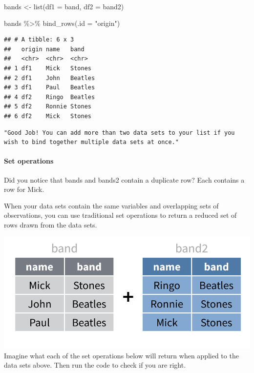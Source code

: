 \documentclass[
]{article}
\newenvironment{Shaded}{\begin{snugshade}}{\end{snugshade}}
\newcommand{\AttributeTok}[1]{\textcolor[rgb]{0.77,0.63,0.00}{#1}}
\newcommand{\FunctionTok}[1]{\textcolor[rgb]{0.00,0.00,0.00}{#1}}
\newcommand{\NormalTok}[1]{#1}
\newcommand{\OtherTok}[1]{\textcolor[rgb]{0.56,0.35,0.01}{#1}}
\newcommand{\SpecialCharTok}[1]{\textcolor[rgb]{0.00,0.00,0.00}{#1}}
\newcommand{\StringTok}[1]{\textcolor[rgb]{0.31,0.60,0.02}{#1}}
\begin{document}
\begin{Shaded}
\begin{Highlighting}[]
\NormalTok{bands }\OtherTok{\textless{}{-}} \FunctionTok{list}\NormalTok{(}\AttributeTok{df1 =}\NormalTok{ band, }
              \AttributeTok{df2 =}\NormalTok{ band2)}

\NormalTok{bands }\SpecialCharTok{\%\textgreater{}\%} \FunctionTok{bind\_rows}\NormalTok{(}\AttributeTok{.id =} \StringTok{"origin"}\NormalTok{)}
\end{Highlighting}
\end{Shaded}

\begin{verbatim}
## # A tibble: 6 x 3
##   origin name   band   
##   <chr>  <chr>  <chr>  
## 1 df1    Mick   Stones 
## 2 df1    John   Beatles
## 3 df1    Paul   Beatles
## 4 df2    Ringo  Beatles
## 5 df2    Ronnie Stones 
## 6 df2    Mick   Stones
\end{verbatim}

\begin{verbatim}
"Good Job! You can add more than two data sets to your list if you wish to bind together multiple data sets at once."
\end{verbatim}

\hypertarget{set-operations}{%
\paragraph{Set operations}\label{set-operations}}

Did you notice that bands and bands2 contain a duplicate row? Each
contains a row for Mick.

When your data sets contain the same variables and overlapping sets of
observations, you can use traditional set operations to return a reduced
set of rows drawn from the data sets.

\includegraphics{data/band2-1.png} Imagine what each of the set
operations below will return when applied to the data sets above. Then
run the code to check if you are right.
\end{document}
